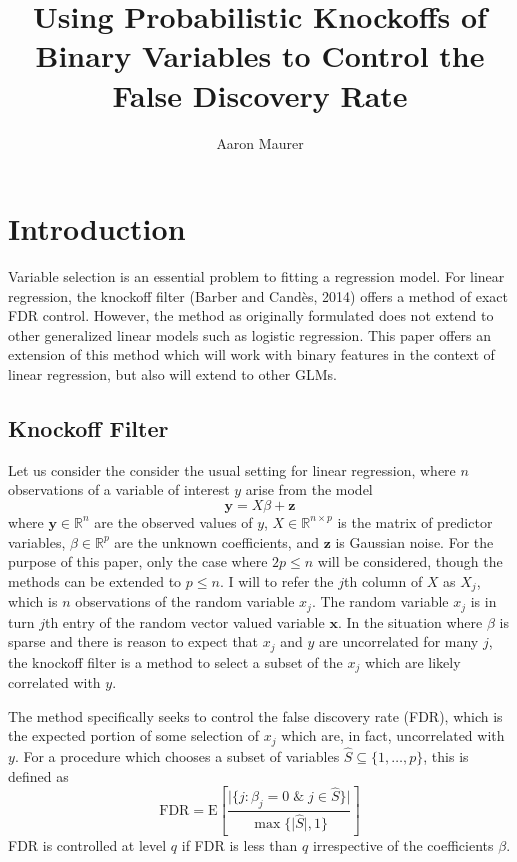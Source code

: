 \documentclass[11pt]{article}
\newcommand{\R}{\mathbb{R}}
\newcommand{\E}{\mathrm{E}}
\theoremstyle{definition}
\begin{document}
\title{Using Probabilistic Knockoffs of Binary Variables to Control the False Discovery Rate}
\author{Aaron Maurer}
\maketitle
\section{Introduction}
    Variable selection is an essential problem to fitting a regression model. For linear regression, the knockoff filter (Barber and Cand\`{e}s, 2014) offers a method of exact FDR control. However, the method as originally formulated does not extend to other generalized linear models such as logistic regression. This paper offers an extension of this method which will work with binary features in the context of linear regression, but also will extend to other GLMs.  
    
\subsection{Knockoff Filter}
    Let us consider the consider the usual setting for linear regression, where $n$ observations of a variable of interest $y$ arise from the model
    \[\mathbf{y} = X\beta + \mathbf{z}\]
    where $\mathbf{y}\in\R^n$ are the observed values of $y$, $X \in \R^{n\times p}$ is the matrix of predictor variables, $\beta\in\R^p$ are the unknown coefficients, and $\mathbf z$ is Gaussian noise. For the purpose of this paper, only the case where $2p\leq n$ will be considered, though the methods can be extended to $p\leq n$. I will to refer the $j$th column of $X$ as $X_j$, which is $n$ observations of the random variable $x_j$. The random variable $x_j$ is in turn $j$th entry of the random vector valued variable $\mathbf x$. In the situation where $\beta$ is sparse and there is reason to expect that $x_j$ and $y$ are uncorrelated for many $j$, the knockoff filter is a method to select a subset of the $x_j$ which are likely correlated with $y$. \par
    The method specifically seeks to control the false discovery rate (FDR), which is the expected portion of some selection of $x_j$ which are, in fact, uncorrelated with $y$. For a procedure which chooses a subset of variables $\hat S\subseteq \{1,\ldots,p\}$, this is defined as  
    \[ \textrm{FDR} = \E\left[\frac{\vert{\{j: \beta_j=0 \; \& \; j\in\hat S\}}\vert}{\max\{\vert{\hat S}\vert,1\}} \right] \]
    FDR is controlled at level $q$ if FDR is less than $q$ irrespective of the coefficients $\beta$. \par
\end{document}
